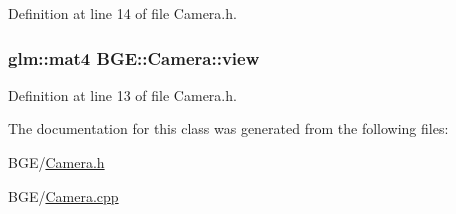 Definition at line 14 of file Camera.\-h.

\hypertarget{class_b_g_e_1_1_camera_a98426bb25b753026221e3596049c3629}{
\subsubsection[{view}]{\setlength{\rightskip}{0pt plus 5cm}glm\-::mat4 B\-G\-E\-::\-Camera\-::view}}\label{class_b_g_e_1_1_camera_a98426bb25b753026221e3596049c3629}


Definition at line 13 of file Camera.\-h.



The documentation for this class was generated from the following files\-:\begin{DoxyCompactItemize}
\item 
B\-G\-E/\hyperlink{_camera_8h}{Camera.\-h}\item 
B\-G\-E/\hyperlink{_camera_8cpp}{Camera.\-cpp}\end{DoxyCompactItemize}
